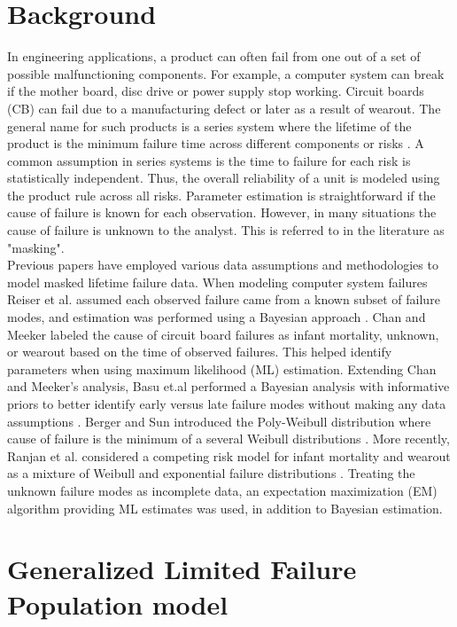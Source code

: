 \documentclass[12pt]{article}
\begin{document}
\section{Background}
\label{sec:Background}
In engineering applications, a product can often fail from one out of a set of possible malfunctioning components.  For example, a computer system can break if the mother board, disc drive or power supply stop working.  Circuit boards (CB) can fail due to a manufacturing defect or later as a result of wearout.  The general name for such products is a series system where the lifetime of the product is the minimum failure time across different components or risks \cite{nelson}.  A common assumption in series systems is the time to failure for each risk is statistically independent.  Thus, the overall reliability of a unit is modeled using the product rule across all risks.  Parameter estimation is straightforward if the cause of failure is known for each observation.  However, in many situations the cause of failure is unknown to the analyst. This is referred to in the literature as "masking".\\

Previous papers have employed various data assumptions and methodologies to model masked lifetime failure data.  When modeling computer system failures Reiser et al. assumed each observed failure came from a known subset of failure modes, and estimation was performed using a Bayesian approach \cite{reiser}.  Chan and Meeker labeled the cause of circuit board failures as infant mortality, unknown, or wearout based on the time of observed failures.  This helped identify parameters when using maximum likelihood (ML) estimation.  Extending Chan and Meeker's analysis, Basu et.al performed a Bayesian analysis with informative priors to better identify early versus late failure modes without making any data assumptions \cite{basu}.  Berger and Sun introduced the Poly-Weibull distribution where cause of failure is the minimum of a several Weibull distributions \cite{berger}.  More recently, Ranjan et al. considered a competing risk model for infant mortality and wearout as a mixture of Weibull and exponential failure distributions \cite{ranjan}.  Treating the unknown failure modes as incomplete data, an expectation maximization (EM) algorithm providing ML estimates was used, in addition to Bayesian estimation.


\section{Generalized Limited Failure Population model}
\label{sec:GLFP model}
\end{document}
